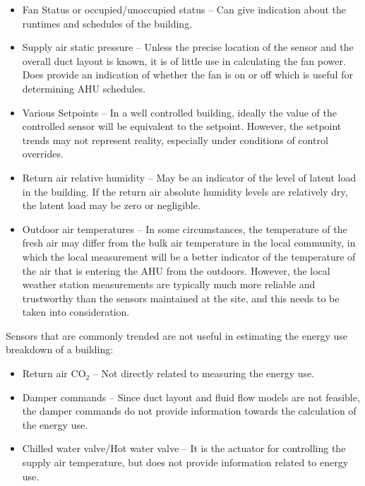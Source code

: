 \begin{itemize}
\item Fan Status or occupied/unoccupied status -- Can give indication about the runtimes and schedules of the building.
\item Supply air static pressure -- Unless the precise location of the sensor and the overall duct layout is known, it is of little use in calculating the fan power. Does provide an indication of whether the fan is on or off which is useful for determining AHU schedules.
\item Various Setpoints -- In a well controlled building, ideally the value of the controlled sensor will be equivalent to the setpoint. However, the setpoint trends may not represent reality, especially under conditions of control overrides. 
\item Return air relative humidity -- May be an indicator of the level of latent load in the building. If the return air absolute humidity levels are relatively dry, the latent load may be zero or negligible. 
\item Outdoor air temperatures -- In some circumstances, the temperature of the fresh air may differ from the bulk air temperature in the local community, in which the local measurement will be a better indicator of the temperature of the air that is entering the AHU from the outdoors. However, the local weather station measurements are typically much more reliable and trustworthy than the sensors maintained at the site, and this needs to be taken into consideration.
\end{itemize}

Sensors that are commonly trended are not useful in estimating the energy use breakdown of a building:
\begin{itemize}
\item Return air CO\(_2\) -- Not directly related to measuring the energy use.
\item Damper commands -- Since duct layout and fluid flow models are not feasible, the damper commands do not provide information towards the calculation of the energy use. 
\item Chilled water valve/Hot water valve -- It is the actuator for controlling the supply air temperature, but does not provide information related to energy use.
\end{itemize}





